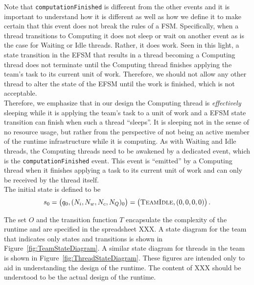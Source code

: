 \documentclass{article}
\newcommand{\TeamIdle}          {\textsc{TeamIdle}}
\begin{document}
Note that \texttt{computationFinished} is different from the other events and it
is important to understand how it is different as well as how we define it to
make certain that this event does not break the rules of a FSM.  Specifically,
when a thread transitions to Computing it does not sleep or wait on another
event as is the case for Waiting or Idle threads.  Rather, it does work.  Seen
in this light, a state transition in the EFSM that results in a thread becoming
a Computing thread does not terminate until the Computing thread finishes
applying the team's task to its current unit of work.  Therefore, we should not
allow any other thread to alter the state of the EFSM until the work is
finished, which is not acceptable.\\

Therefore, we emphasize that in our design the Computing thread is
\textit{effectively} sleeping while it is applying the team's task to a unit of
work and a EFSM state transition can finish when such a thread ``sleeps''.  It is sleeping not in the sense of no resource usage, but rather from the
perspective of not being an active member of the runtime infrastructure while it
is computing.  As with Waiting and Idle threads, the Computing threads need to
be awakened by a dedicated event, which is the \texttt{computationFinished}
event.  This event is ``emitted'' by a Computing thread when it finishes
applying a task to its current unit of work and can only be received by the thread
itself.\\

The initial state is defined to be
\[
s_0 = \left(q_0, (N_i, N_w, N_c, N_Q)_0\right) = \left(\TeamIdle, (0, 0, 0, 0)\right).
\]

The set $O$ and the transition function $T$ encapsulate the complexity of the
runtime and are specified in the spreadsheet XXX.  A state diagram for the team
that indicates only states and transitions is shown in
Figure~\ref{fig:TeamStateDiagram}.  A similar state diagram for threads in the
team is shown in Figure~\ref{fig:ThreadStateDiagram}.  These figures are
intended only to aid in understanding the design of the runtime.  The content of
XXX should be understood to be the actual design of the runtime.\\
\end{document}
